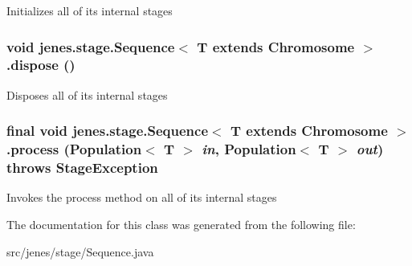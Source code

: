 Initializes all of its internal stages \hypertarget{classjenes_1_1stage_1_1_sequence_3_01_t_01extends_01_chromosome_01_4_4faf3479fa76eef530633ce8339971e5}{
\subsubsection[dispose]{\setlength{\rightskip}{0pt plus 5cm}void jenes.stage.Sequence$<$ T extends Chromosome $>$.dispose ()}}
\label{classjenes_1_1stage_1_1_sequence_3_01_t_01extends_01_chromosome_01_4_4faf3479fa76eef530633ce8339971e5}


Disposes all of its internal stages \hypertarget{classjenes_1_1stage_1_1_sequence_3_01_t_01extends_01_chromosome_01_4_dc0e7397edd44839ef221122db3696e8}{
\subsubsection[process]{\setlength{\rightskip}{0pt plus 5cm}final void jenes.stage.Sequence$<$ T extends Chromosome $>$.process (Population$<$ T $>$ {\em in}, \/  Population$<$ T $>$ {\em out})  throws {\bf StageException} }}
\label{classjenes_1_1stage_1_1_sequence_3_01_t_01extends_01_chromosome_01_4_dc0e7397edd44839ef221122db3696e8}


Invokes the process method on all of its internal stages 

The documentation for this class was generated from the following file:\begin{CompactItemize}
\item 
src/jenes/stage/Sequence.java\end{CompactItemize}
